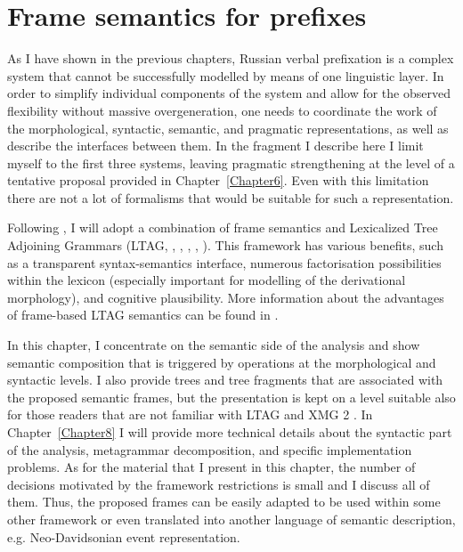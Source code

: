 
\chapter{Frame semantics for prefixes} %
\label{Chapter7}

As I have shown in the previous chapters, Russian verbal prefixation is a complex system that cannot be successfully modelled by means of one linguistic layer. In order to simplify individual components of the system and allow for the observed flexibility without massive overgeneration, one needs to coordinate the work of the morphological, syntactic, semantic, and pragmatic representations, as well as describe the interfaces between them. In the fragment I describe here I limit myself to the first three systems, leaving pragmatic strengthening at the level of a tentative proposal provided in Chapter~\ref{Chapter6}. Even with this limitation there are not a lot of formalisms that would be suitable for such a representation.

Following \citet{KallmeyerOsswald:12, KallmeyerOsswald:13}, I will adopt a combination of frame semantics \citep{Fillmore:82} and Lexicalized Tree Adjoining Grammars (LTAG, \citealt{JoshiSchabes:97}, \citealt{Frank:92}, \citealt{AbeilleRambow:00}, \citealt{Abeille:02}, \citealt{Frank:02}). This framework has various benefits, such as a transparent syntax-se\-man\-tics interface, numerous factorisation possibilities within the lexicon (especially important for modelling of the derivational morphology), and cognitive plausibility. More information about the advantages of frame-based LTAG semantics can be found in \citet{KallmeyerOsswald:13}. 

In this chapter, I concentrate on the semantic side of the analysis and show semantic composition that is triggered by operations at the morphological and syntactic levels. I also provide trees and tree fragments that are associated with the proposed semantic frames, but the presentation is kept on a level suitable also for those readers that are not familiar with LTAG and XMG 2 \citep{Petitjean:16}. In Chapter~\ref{Chapter8} I will provide more technical details about the syntactic part of the analysis, metagrammar decomposition, and specific implementation problems. As for the material that I present in this chapter, the number of decisions motivated by the framework restrictions is small and I discuss all of them. Thus, the proposed frames can be easily adapted to be used within some other framework or even translated into another language of semantic description, e.g. Neo-Davidsonian event representation.

